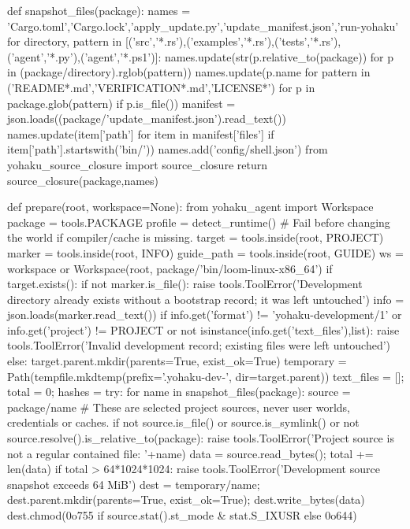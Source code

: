 def snapshot_files(package):
    names = {'Cargo.toml','Cargo.lock','apply_update.py','update_manifest.json','run-yohaku'}
    for directory, pattern in [('src','*.rs'),('examples','*.rs'),('tests','*.rs'),('agent','*.py'),('agent','*.ps1')]:
        names.update(str(p.relative_to(package)) for p in (package/directory).rglob(pattern))
    names.update(p.name for pattern in ('README*.md','VERIFICATION*.md','LICENSE*') for p in package.glob(pattern) if p.is_file())
    manifest = json.loads((package/'update_manifest.json').read_text())
    names.update(item['path'] for item in manifest['files'] if item['path'].startswith('bin/'))
    names.add('config/shell.json')
    from yohaku_source_closure import source_closure
    return source_closure(package,names)


def prepare(root, workspace=None):
    from yohaku_agent import Workspace
    package = tools.PACKAGE
    profile = detect_runtime()  # Fail before changing the world if compiler/cache is missing.
    target = tools.inside(root, PROJECT)
    marker = tools.inside(root, INFO)
    guide_path = tools.inside(root, GUIDE)
    ws = workspace or Workspace(root, package/'bin/loom-linux-x86_64')
    if target.exists():
        if not marker.is_file(): raise tools.ToolError('Development directory already exists without a bootstrap record; it was left untouched')
        info = json.loads(marker.read_text())
        if info.get('format') != 'yohaku-development/1' or info.get('project') != PROJECT or not isinstance(info.get('text_files'),list):
            raise tools.ToolError('Invalid development record; existing files were left untouched')
    else:
        target.parent.mkdir(parents=True, exist_ok=True)
        temporary = Path(tempfile.mkdtemp(prefix='.yohaku-dev-', dir=target.parent))
        text_files = []; total = 0; hashes = {}
        try:
            for name in snapshot_files(package):
                source = package/name
                # These are selected project sources, never user worlds, credentials or caches.
                if not source.is_file() or source.is_symlink() or not source.resolve().is_relative_to(package):
                    raise tools.ToolError('Project source is not a regular contained file: '+name)
                data = source.read_bytes(); total += len(data)
                if total > 64*1024*1024: raise tools.ToolError('Development source snapshot exceeds 64 MiB')
                dest = temporary/name; dest.parent.mkdir(parents=True, exist_ok=True); dest.write_bytes(data)
                dest.chmod(0o755 if source.stat().st_mode & stat.S_IXUSR else 0o644)
